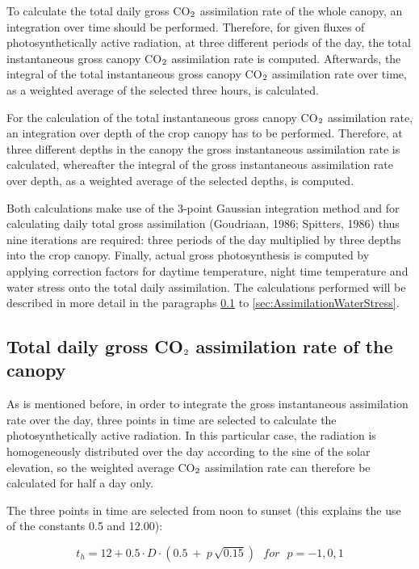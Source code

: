 To calculate the total daily gross CO$_{{\rm 2}}$ assimilation rate of the whole canopy, 
an integration over time should be performed. Therefore, for given fluxes of photosynthetically
active radiation, at three different periods of the day, the total instantaneous gross canopy
CO$_{{\rm 2}}$ assimilation rate is computed. Afterwards, the integral of the total instantaneous
gross canopy CO$_{{\rm 2}}$ assimilation rate over time, as a weighted average of the selected three
hours, is calculated.

For the calculation of the total instantaneous gross canopy CO$_{{\rm 2}}$ assimilation rate, an
integration over depth of the crop canopy has to be performed.
Therefore, at three different depths in the canopy the gross instantaneous assimilation rate
is calculated, whereafter the integral of the gross instantaneous assimilation rate over
depth, as a weighted average of the selected depths, is computed.

Both calculations make use of the 3-point Gaussian integration method and for calculating daily total 
gross assimilation (Goudriaan, 1986; Spitters, 1986) thus nine iterations are required: three periods
of the day multiplied by three depths into the crop canopy. Finally, actual gross photosynthesis is 
computed by applying correction factors for daytime temperature,
night time temperature and water stress onto the total daily assimilation. The calculations performed
will be described in more detail in the paragraphs \ref{sec:DailyGrossAssimilation} to 
\ref{sec:AssimilationWaterStress}.


\subsection{Total daily gross CO$_{{\rm 2}}$ assimilation rate of the canopy}
\label{sec:DailyGrossAssimilation}

As is mentioned before, in order to integrate the gross instantaneous assimilation rate
over the day, three points in time are selected to calculate the photosynthetically active
radiation. In this particular case, the radiation is homogeneously distributed over the day
according to the sine of the solar elevation, so the weighted average CO$_{{\rm 2}}$ 
assimilation rate can therefore be calculated for half a day only.

The three points in time are selected from noon to sunset (this explains the use of the
constants 0.5 and 12.00):

\begin{equation}
t_{h} = 12 + 0.5 \cdot D \cdot (0.5 ~+~ p\, \sqrt{0.15}) ~~~ for ~~~ p = -1,0,1
\end{equation}

